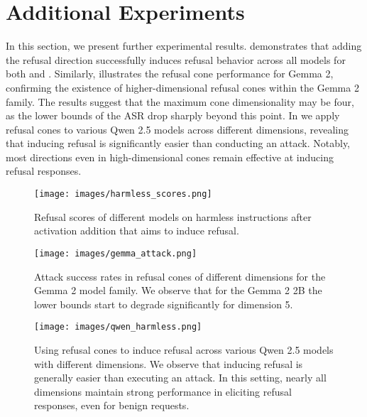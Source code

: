\section{Additional Experiments}\label{app:additional-experiments}

In this section, we present further experimental results.  demonstrates that adding the refusal direction successfully induces refusal behavior across all models for both \dimacro and \oursacro. Similarly,  illustrates the refusal cone performance for Gemma 2, confirming the existence of higher-dimensional refusal cones within the Gemma 2 family. The results suggest that the maximum cone dimensionality may be four, as the lower bounds of the ASR drop sharply beyond this point. In  we apply refusal cones to various Qwen 2.5 models across different dimensions, revealing that inducing refusal is significantly easier than conducting an attack. Notably, most directions even in high-dimensional cones remain effective at inducing refusal responses.

\begin{figure}
    \centering
    \texttt{[image: images/harmless\_scores.png]}
    \caption{Refusal scores of different models on harmless instructions after activation addition that aims to induce refusal.}
    \label{fig:ind-refusal}
\end{figure}
\begin{figure}
    \centering
    \hspace*{5em} 
    \texttt{[image: images/gemma\_attack.png]}
    \caption{Attack success rates in refusal cones of different dimensions for the Gemma 2 model family. We observe that for the Gemma 2 2B the lower bounds start to degrade significantly for dimension 5.}
    \label{fig:gemma-cones}
\end{figure}
\begin{figure}
    \centering
    \hspace*{5em} 
    \texttt{[image: images/qwen\_harmless.png]}
    \caption{Using refusal cones to induce refusal across various Qwen 2.5 models with different dimensions. We observe that inducing refusal is generally easier than executing an attack. In this setting, nearly all dimensions maintain strong performance in eliciting refusal responses, even for benign requests.}
    \label{fig:subspace-induce}
\end{figure}

